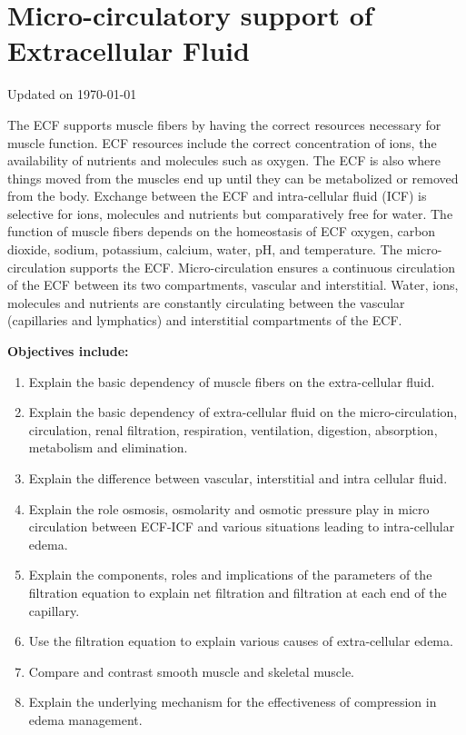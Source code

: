 \chapter{Micro-circulatory support of Extracellular Fluid}\label{chp:ecf_microcirculation}
Updated on \today
\minitoc

The ECF supports muscle fibers by having the correct resources necessary for muscle function. ECF resources include the correct concentration of ions, the availability of nutrients and molecules such as oxygen. The ECF is also where things moved from the muscles end up until they can be metabolized or removed from the body. Exchange between the ECF and intra-cellular fluid (ICF) is selective for ions, molecules and nutrients but comparatively free for water. The function of muscle fibers depends on the homeostasis of ECF oxygen, carbon dioxide, sodium, potassium, calcium, water, pH, and temperature.
The micro-circulation supports the ECF. Micro-circulation ensures a continuous circulation of the ECF between its two compartments, vascular and interstitial. Water, ions, molecules and nutrients are constantly circulating between the vascular (capillaries and lymphatics) and interstitial compartments of the ECF. 

\vspace{5mm}

\textbf{Objectives include:}
\begin{enumerate}
    \item Explain the basic dependency of muscle fibers on the extra-cellular fluid.
    \item Explain the basic dependency of extra-cellular fluid on the micro-circulation, circulation, renal filtration, respiration, ventilation, digestion, absorption, metabolism and elimination.
    \item Explain the difference between vascular, interstitial and intra cellular fluid.
    \item Explain the role osmosis, osmolarity and osmotic pressure play in micro circulation between ECF-ICF and various situations leading to intra-cellular edema.
    \item Explain the components, roles and implications of the parameters of the filtration equation to explain net filtration and filtration at each end of the capillary.
    \item Use the filtration equation to explain various causes of extra-cellular edema.
    \item Compare and contrast smooth muscle and skeletal muscle.
    \item Explain the underlying mechanism for the effectiveness of compression in edema management.
\end{enumerate}

